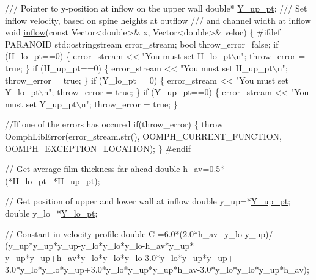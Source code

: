 \begin{DoxyCodeInclude}
\textcolor{comment}{ /// Pointer to y-position at inflow on the upper wall}
\textcolor{comment}{} \textcolor{keywordtype}{double}* \hyperlink{namespaceGlobal__Physical__Variables_a75878a0c79c88065fd9031f273b62698}{Y\_up\_pt};
\textcolor{comment}{}
\textcolor{comment}{ /// Set inflow velocity, based on spine heights at outflow}
\textcolor{comment}{ /// and channel width at inflow}
\textcolor{comment}{} \textcolor{keywordtype}{void} \hyperlink{namespaceGlobal__Physical__Variables_a08e9835d71b7f7194ec5475f139211be}{inflow}(\textcolor{keyword}{const} Vector<double>& x, Vector<double>& veloc)
 \{
\textcolor{preprocessor}{#ifdef PARANOID}
  std::ostringstream error\_stream;
  \textcolor{keywordtype}{bool} throw\_error=\textcolor{keyword}{false};
  \textcolor{keywordflow}{if} (H\_lo\_pt==0) 
   \{
    error\_stream << \textcolor{stringliteral}{"You must set H\_lo\_pt\(\backslash\)n"};
    throw\_error = \textcolor{keyword}{true};
   \}
  \textcolor{keywordflow}{if} (H\_up\_pt==0) 
   \{
    error\_stream << \textcolor{stringliteral}{"You must set H\_up\_pt\(\backslash\)n"};
    throw\_error = \textcolor{keyword}{true};
   \}
  \textcolor{keywordflow}{if} (Y\_lo\_pt==0) 
   \{
    error\_stream << \textcolor{stringliteral}{"You must set Y\_lo\_pt\(\backslash\)n"};
    throw\_error = \textcolor{keyword}{true};
   \}
  \textcolor{keywordflow}{if} (Y\_up\_pt==0) 
   \{
    error\_stream << \textcolor{stringliteral}{"You must set Y\_up\_pt\(\backslash\)n"};
    throw\_error = \textcolor{keyword}{true};
   \}

  \textcolor{comment}{//If one of the errors has occured}
  \textcolor{keywordflow}{if}(throw\_error)
   \{
    \textcolor{keywordflow}{throw} OomphLibError(error\_stream.str(),
                        OOMPH\_CURRENT\_FUNCTION,
                        OOMPH\_EXCEPTION\_LOCATION);
   \}
\textcolor{preprocessor}{#endif}


  \textcolor{comment}{// Get average film thickness far ahead}
  \textcolor{keywordtype}{double} h\_av=0.5*(*H\_lo\_pt+*\hyperlink{namespaceGlobal__Physical__Variables_a83a3a82f89784013805bd23d63faa7e3}{H\_up\_pt});

  \textcolor{comment}{// Get position of upper and lower wall at inflow}
  \textcolor{keywordtype}{double} y\_up=*\hyperlink{namespaceGlobal__Physical__Variables_a75878a0c79c88065fd9031f273b62698}{Y\_up\_pt};
  \textcolor{keywordtype}{double} y\_lo=*\hyperlink{namespaceGlobal__Physical__Variables_a84caa2a64e50ba5b390a3cd100f0f835}{Y\_lo\_pt};

  \textcolor{comment}{// Constant in velocity profile}
  \textcolor{keywordtype}{double} C =6.0*(2.0*h\_av+y\_lo-y\_up)/
   (y\_up*y\_up*y\_up-y\_lo*y\_lo*y\_lo-h\_av*y\_up*
    y\_up*y\_up+h\_av*y\_lo*y\_lo*y\_lo-3.0*y\_lo*y\_up*y\_up+
    3.0*y\_lo*y\_lo*y\_up+3.0*y\_lo*y\_up*y\_up*h\_av-3.0*y\_lo*y\_lo*y\_up*h\_av);


\end{DoxyCodeInclude}
